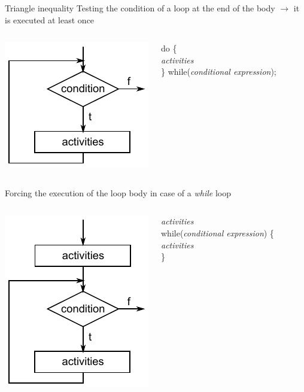 \documentclass[usenames,dvipsnames,aspectratio=169]{beamer}
\begin{document}
\begin{frame}{Triangle inequality}
  Testing the condition of a loop at the end of the body $\to$ it is executed at least once
  \begin{columns}[c]
      \begin{center}
        \includegraphics[scale=0.65]{testAfter.pdf}
      \end{center}
      do \{ \\
      \hspace{0.5cm} \emph{activities} \\
      \} while(\emph{conditional expression});
  \end{columns}
  \vfill
  Forcing the execution of the loop body in case of a \emph{while} loop
  \begin{columns}[c]
      \begin{center}
        \includegraphics[scale=0.65]{testBefore2.pdf}
      \end{center}
      \emph{activities} \\
      while(\emph{conditional expression}) \{ \\
      \hspace{0.5cm} \emph{activities} \\
      \}
  \end{columns}
\end{frame}
\end{document}
